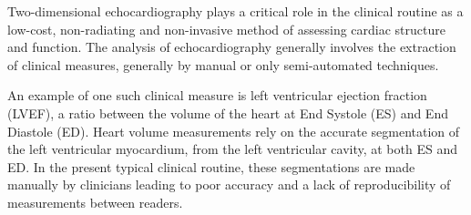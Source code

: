 Two-dimensional echocardiography plays a critical role in the clinical routine
as a low-cost, non-radiating and non-invasive method of assessing cardiac
structure and function. The analysis of echocardiography generally involves the
extraction of clinical measures, generally by manual or only semi-automated
techniques. \newline

An example of one such clinical measure is left ventricular ejection fraction
(LVEF), a ratio between the volume of the heart at End Systole (ES) and End
Diastole (ED). Heart volume measurements rely on the accurate segmentation of
the left ventricular myocardium, from the left ventricular cavity, at both ES
and ED. In the present typical clinical routine, these segmentations are made
manually by clinicians leading to poor accuracy and a lack of reproducibility of
measurements between readers.